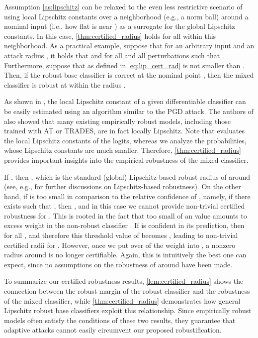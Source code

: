 \documentclass[11pt, letterpaper]{article}
\theoremstyle{plain}
\theoremstyle{definition}
\begin{document}
Assumption \ref{as:lipschitz} can be relaxed to the even less restrictive scenario of using local Lipschitz constants over a neighborhood (e.g., a norm ball) around a nominal input  (i.e., how flat  is near ) as a surrogate for the global Lipschitz constants. In this case, \cref{thm:certified_radius} holds for all  within this neighborhood. As a practical example, suppose that for an arbitrary input  and an  attack radius , it holds that  and  for all  and all perturbations  such that . Furthermore, suppose that  as defined in \cref{eq:lip_cert_rad} is not smaller than . Then, if the robust base classifier is correct at the nominal point , then the mixed classifier is robust at  within the radius .

As shown in \citep{Yang20}, the local Lipschitz constant of a given differentiable classifier can be easily estimated using an algorithm similar to the PGD attack. The authors of \citep{Yang20} also showed that many existing empirically robust models, including those trained with AT or TRADES, are in fact locally Lipschitz. Note that \citep{Yang20} evaluates the local Lipschitz constants of the logits, whereas we analyze the probabilities, whose Lipschitz constants are much smaller. Therefore, \cref{thm:certified_radius} provides important insights into the empirical robustness of the mixed classifier.

If , then , which is the standard (global) Lipschitz-based robust radius of  around  (see, e.g., \cite{Fazlyab19, Hein17} for further discussions on Lipschitz-based robustness). On the other hand, if  is too small in comparison to the relative confidence of , namely, if there exists  such that , then , and in this case we cannot provide non-trivial certified robustness for . This is rooted in the fact that too small of an  value amounts to excess weight in the non-robust classifier . If  is  confident in its prediction, then  for all , and therefore this threshold value of  becomes , leading to non-trivial certified radii for . However, once we put over  of the weight into , a nonzero radius around  is no longer certifiable. Again, this is intuitively the best one can expect, since no assumptions on the robustness of  around  have been made.

To summarize our certified robustness results, \cref{lem:certified_radius} shows the connection between the robust margin of the robust classifier and the robustness of the mixed classifier, while \cref{thm:certified_radius} demonstrates how general Lipschitz robust base classifiers exploit this relationship. Since empirically robust models often satisfy the conditions of these two results, they guarantee that adaptive attacks cannot easily circumvent our proposed robustification.
\end{document}
